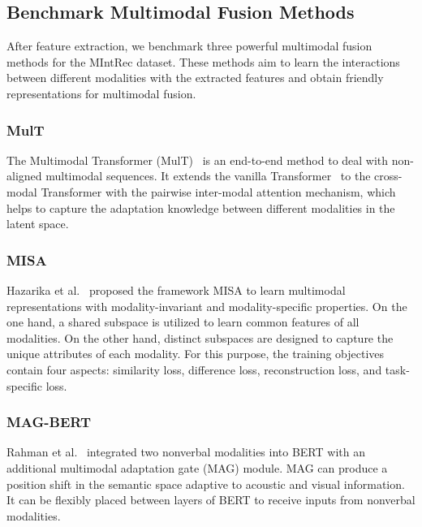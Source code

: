 \documentclass[sigconf,camera-ready]{acmart}
\begin{document}
\subsection{Benchmark Multimodal Fusion Methods}
\label{benchmark}
After feature extraction, we benchmark three powerful multimodal fusion methods for the MIntRec dataset. These methods aim to learn the interactions between different modalities with the extracted features and obtain friendly representations for multimodal fusion. 

\subsubsection{MulT}
The Multimodal Transformer (MulT)~\cite{tsai2019multimodal} is an end-to-end method to deal with non-aligned multimodal sequences. It extends the vanilla Transformer~\cite{Transformer} to the cross-modal Transformer with the pairwise inter-modal attention mechanism, which helps to capture the adaptation knowledge between different modalities in the latent space.

\subsubsection{MISA}
Hazarika et al.~\cite{hazarika2020misa} proposed the framework MISA to learn multimodal representations with modality-invariant and modality-specific properties. On the one hand, a shared subspace is utilized to learn common features of all modalities. On the other hand, distinct subspaces are designed to capture the unique attributes of each modality. For this purpose, the training objectives contain four aspects: similarity loss, difference loss,  reconstruction loss, and task-specific loss.

\subsubsection{MAG-BERT}
Rahman et al.~\cite{BERT_MAG} integrated two nonverbal modalities into BERT with an additional multimodal adaptation gate (MAG) module. MAG can produce a position shift in the semantic space adaptive to acoustic and visual information. It can be flexibly placed between layers of BERT to receive inputs from nonverbal modalities. 
\end{document}
